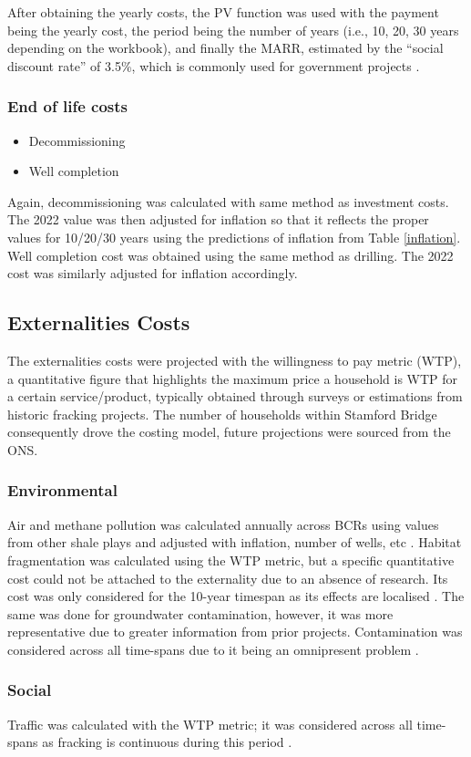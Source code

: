 \documentclass[10pt]{article}
\begin{document}
After obtaining the yearly costs, the PV function was used with the payment being the yearly cost, the period being the number of years (i.e., 10, 20, 30 years depending on the workbook), and finally the MARR, estimated by the ``social discount rate'' of 3.5\%, which is commonly used for government projects \cite{013}.
\subsubsection{End of life costs}
\begin{itemize}
    \item Decommissioning
    \item Well completion
\end{itemize}
Again, decommissioning was calculated with same method as investment costs. The 2022 value was then adjusted for inflation so that it reflects the proper values for 10/20/30 years using the predictions of inflation from Table \ref{inflation}. Well completion cost was obtained using the same method as drilling. The 2022 cost was similarly adjusted for inflation accordingly.
\subsection{Externalities Costs}
The externalities costs were projected with the willingness to pay metric (WTP), a quantitative figure that highlights the maximum price a household is WTP for a certain service/product, typically obtained through surveys or estimations from historic fracking projects. The number of households within Stamford Bridge consequently drove the costing model, future projections were sourced from the ONS.
\subsubsection{Environmental}
Air and methane pollution was calculated annually across BCRs using values from other shale plays and adjusted with inflation, number of wells, etc \cite{019}. Habitat fragmentation was calculated using the WTP metric, but a specific quantitative cost could not be attached to the externality due to an absence of research. Its cost was only considered for the 10-year timespan as its effects are localised \cite{LOOMIS2017160}. The same was done for groundwater contamination, however, it was more representative due to greater information from prior projects. Contamination was considered across all time-spans due to it being an omnipresent problem \cite{019}.
\subsubsection{Social}
Traffic was calculated with the WTP metric; it was considered across all time-spans as fracking is continuous during this period \cite{doi:10.1146/annurev-resource-110320-092648}.
\end{document}
